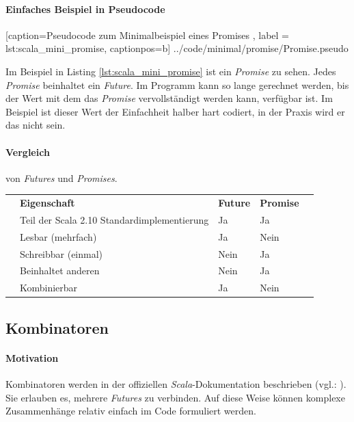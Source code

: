 \paragraph{Einfaches Beispiel in Pseudocode}


    [caption={Pseudocode zum Minimalbeispiel eines Promises },
       label = lst:scala_mini_promise,
       captionpos=b]
 {../code/minimal/promise/Promise.pseudo}
 
Im Beispiel in Listing \ref{lst:scala_mini_promise} ist ein \emph{Promise} zu sehen.
Jedes \emph{Promise} beinhaltet ein \emph{Future}. Im Programm kann
so lange gerechnet werden, bis der Wert mit dem das \emph{Promise}
vervollständigt werden kann, verfügbar ist. Im Beispiel ist dieser
Wert der Einfachheit halber hart codiert, in der Praxis wird er das
nicht sein.

\paragraph{Vergleich} von \emph{Futures} und \emph{Promises}.

\begin{table}[h]
\begin{tabular}{lllll}
 & \textbf{Eigenschaft} & \textbf{Future} & \textbf{Promise} &  \\
 & Teil der Scala 2.10 Standardimplementierung & Ja & Ja &  \\
 & Lesbar (mehrfach) & Ja & Nein &  \\
 & Schreibbar (einmal) & Nein & Ja &  \\
 & Beinhaltet anderen & Nein & Ja &  \\
 & Kombinierbar & Ja & Nein &  \\
\end{tabular}
\end{table}

\subsection{Kombinatoren}

\paragraph{Motivation} Kombinatoren werden in der offiziellen 
\emph{Scala}-Dokumentation beschrieben (vgl.: \cite{scalaDokuFP}).
Sie erlauben es, mehrere \emph{Futures} zu verbinden. 
Auf diese Weise können komplexe Zusammenhänge relativ einfach
im Code formuliert werden.

